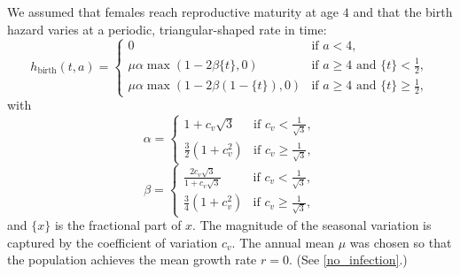 \documentclass[12pt]{article}
\begin{document}
We assumed that females reach reproductive maturity at age $4$ and
that the birth hazard varies at a periodic, triangular-shaped rate in
time:
\begin{equation}
  h_{\text{birth}}(t, a) =
  \begin{cases}
    0 & \text{if $a < 4$},
    \\
    \mu \alpha \max\left(1 - 2 \beta \{t\}, 0\right)
    & \text{if $a \geq 4$ and $\{t\} < \frac{1}{2}$},
    \\
    \mu \alpha \max\left(1 - 2 \beta (1 - \{t\}), 0\right)
    & \text{if $a \geq 4$ and $\{t\} \geq \frac{1}{2}$},
  \end{cases}
\end{equation}
with
\begin{equation}
  \alpha =
  \begin{cases}
    1 + c_v \sqrt{3}
    & \text{if $c_v < \frac{1}{\sqrt{3}}$},
    \\
    \frac{3}{2} \left(1 + c_v^2\right)
    & \text{if $c_v \geq \frac{1}{\sqrt{3}}$},
  \end{cases}
\end{equation}
\begin{equation}
  \beta =
  \begin{cases}
    \frac{2 c_v \sqrt{3}}{1 + c_v \sqrt{3}}
    & \text{if $c_v < \frac{1}{\sqrt{3}}$},
    \\
    \frac{3}{4} \left(1 + c_v^2\right)
    & \text{if $c_v \geq \frac{1}{\sqrt{3}}$},
  \end{cases}
\end{equation}
and $\{x\}$ is the fractional part of $x$.  The magnitude of the
seasonal variation is captured by the coefficient of variation $c_v$.
The annual mean $\mu$ was chosen so that the population achieves the
mean growth rate $r = 0$.  (See \autoref{no_infection}.)
\end{document}
